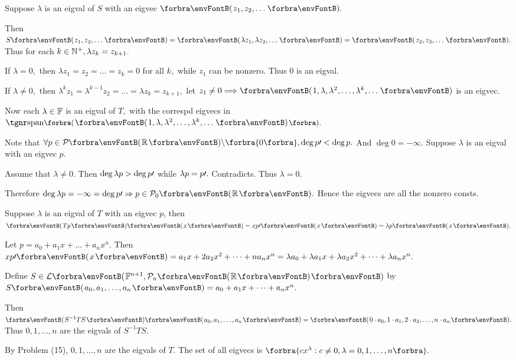 \documentclass[a4paper, 11pt, UTF8]{article}
\begin{document}
\begin{large}
\par\quad
Suppose $\lambda$ is an eigval of $S$ with an eigvec $\Par{z_1,z_2,\dots}.$\par\quad
Then $S\Par{z_1,z_2,\dots}=\Par{\lambda z_1,\lambda z_2,\dots}=\Par{z_2,z_3,\dots}.$ Thus for each $k\in{\mathbb{N}^+},\lambda z_k=z_{k+1}.$\par\quad
If $\lambda=0,$ then $\lambda z_1=z_2=\dots=z_k=0$ for all $k,$ while $z_1$ can be nonzero. Thus $0$ is an eigval.\par\quad
If $\lambda\neq 0,$ then $\lambda^k z_1=\lambda^{k-1} z_2=\dots=\lambda z_k=z_{k+1},$ let $z_1\neq 0\Longrightarrow\Par{1,\lambda,\lambda^2,\dots,\lambda^k,\dots}$ is an eigvec.\par\quad
Now each $\lambda\in{\mathbb{F}}$ is an eigval of $T,$ with the correspd eigvecs in $\Span[\BigPar]{\Par{1,\lambda,\lambda^2,\dots,\lambda^k,\dots}}.$\PfEnd
\SepLine\pagebreak

\par\quad
Note that $\forall p\in\PoR{}\backslash\zeroSubs,\deg p\apostrophe<\deg p.$ And $\deg 0=-\infty.$ Suppose $\lambda$ is an eigval with an eigvec $p.$\par\quad
Assume that $\lambda\neq 0.$ Then $\deg\lambda p>\deg p\prime$ while $\lambda p=p\prime.$ Contradicts. Thus $\lambda=0.$\par\quad
Therefore $\deg \lambda p=-\infty=\deg p\apostrophe\Rightarrow p\in\PoR{0}.$ Hence the eigvecs are all the nonzero consts.\PfEnd
\SepLine

\par\quad
Suppose $\lambda$ is an eigval of $T$ with an eigvec $p$, then $\Par{Tp}\Par{x}=xp\apostrophe\Par{x}=\lambda p\Par{x}.$\par\quad
Let $p=a_0+a_1 x+\dots+a_n x^n.$ Then $xp\apostrophe\Par{x}=a_1 x+2a_2 x^2+\dots+n a_n x^n=\lambda a_0+\lambda a_1 x+\lambda a_2 x^2+\dots+\lambda a_n x^n.$\par\quad
Define $S\in\Lm{\Fbb^{n+1},\PoR{n}}$ by $S\Par{a_0,a_1,\dots,a_n}=a_0+a_1x+\dots+a_nx^n.$\par\quad
Then $\Par{S^{-1}TS}\Par{a_0,a_1,\dots,a_n}=\Par{0\cdot a_0,1\cdot a_1,2\cdot a_2,\dots,n\cdot a_n}.$ Thus $0,1,\dots,n$ are the eigvals of $S^{-1}TS.$\par\quad
By Problem (15), $0,1,\dots,n$ are the eigvals of $T$. The set of all eigvecs is $\Bra{cx^\lambda:c\neq 0,\lambda=0,1,\dots,n}.$\PfEnd
\SepLine


\end{large}
\end{document}
